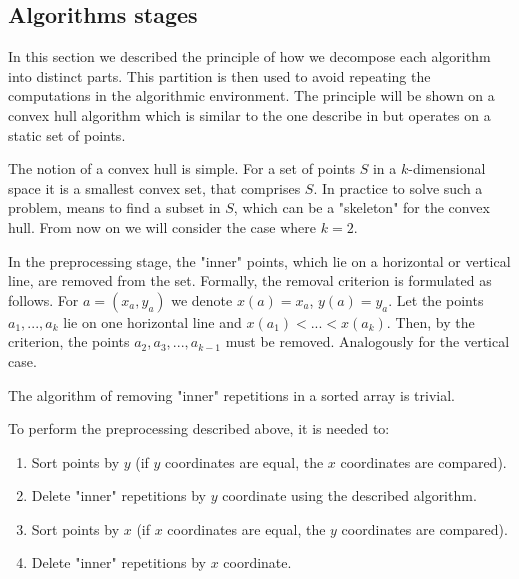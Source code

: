 \documentclass[twoside,twocolumn,10pt]{article}
\begin{document}
\subsection{Algorithms stages}


	In this section we described the principle of how we decompose each algorithm into distinct parts. This partition is then used to avoid repeating the computations in the algorithmic environment. The principle will be shown on a convex hull algorithm which is similar to the one describe in \cite{overmars} but operates on a static set of points.
	
	The notion of a convex hull is simple. For a set of points $S$ in a $k$-dimensional space it is a smallest convex set, that comprises $S$. In practice to solve such a problem, means to find a subset in $S$, which can be a "skeleton" for the convex hull.
	From now on we will consider the case where $k=2$.


	In the preprocessing stage, the "inner" points, which lie on a horizontal or vertical line, are removed from the set. Formally, the removal criterion is formulated as follows. For $a = (x_a, y_a)$ we denote $x(a)=x_a$, $y(a)=y_a$. Let the points $a_1, ..., a_k$ lie on one horizontal line and $x(a_1) < ... < x (a_k) $. Then, by the criterion, the points $a_2, a_3, ..., a_{k-1}$ must be removed. Analogously for the vertical case.
	
	The algorithm of removing "inner" repetitions in a sorted array is trivial.
	
	To perform the preprocessing described above, it is needed to:
	
	\begin{enumerate}
		\item
		Sort points by $y$ (if $y$ coordinates are equal, the $x$ coordinates are compared).
		\item
		Delete "inner" repetitions by $y$ coordinate using the described algorithm.
		\item
		Sort points by $x$ (if $x$ coordinates are equal, the $y$ coordinates are compared).
		\item
		Delete "inner" repetitions by $x$ coordinate.
	\end{enumerate}
\end{document}
